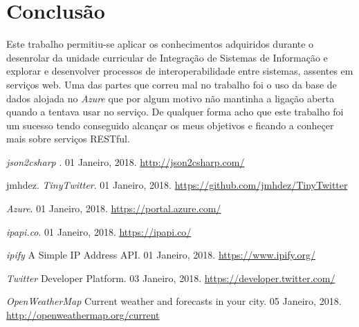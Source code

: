 \documentclass[11pt]{report}
\begin{document}
\chapter*{Conclusão}

Este trabalho permitiu-se aplicar os conhecimentos adquiridos durante o desenrolar da unidade curricular de Integração de Sistemas de Informação e explorar e desenvolver processos de interoperabilidade entre sistemas, assentes em serviços web. Uma das partes que correu mal no trabalho foi o uso da base de dados alojada no \textit{Azure} que por algum motivo não mantinha a ligação aberta quando a tentava usar no serviço. De qualquer forma acho que este trabalho foi um sucesso tendo conseguido alcançar os meus objetivos e ficando a conheçer mais sobre serviços RESTful.

\begin{thebibliography}{2}

	\emph{json2csharp }.  01 Janeiro, 2018. 
	\url{http://json2csharp.com/}


	jmhdez. \emph{TinyTwitter}.  01 Janeiro, 2018. 
	\url{https://github.com/jmhdez/TinyTwitter}


	\emph{Azure}.  01 Janeiro, 2018. 
	\url{https://portal.azure.com/}


	\emph{ipapi.co}.  01 Janeiro, 2018. 
	\url{https://ipapi.co/}


	\emph{ipify} A Simple IP Address API.  01 Janeiro, 2018. 
	\url{https://www.ipify.org/}


	\emph{Twitter} Developer Platform.  03 Janeiro, 2018. 
	\url{https://developer.twitter.com/}


	\emph{OpenWeatherMap} Current weather and forecasts in your city.  05 Janeiro, 2018. 
	\url{http://openweathermap.org/current}
	

\end{thebibliography}
\end{document}
